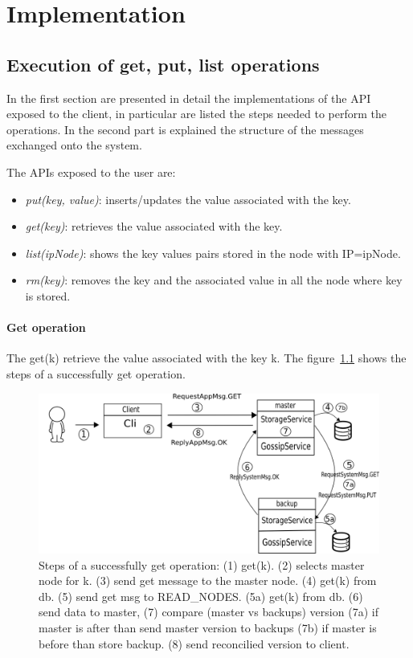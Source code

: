\chapter{Implementation}
\section{Execution of get, put, list operations}
In the first section are presented in detail the implementations of the API exposed to the client, in particular are listed the steps needed to perform the operations.  In the second part  is explained the structure of the messages exchanged onto the system.

The APIs exposed to the user are:
\begin{itemize}
	\item \emph{put(key, value)}: inserts/updates the value associated with the key.
	\item \emph{get(key)}: retrieves the value associated with the key.
	\item \emph{list(ipNode)}: shows the key values pairs stored in the node with IP=ipNode.
	\item \emph{rm(key)}: removes the key and the associated value in all the node where key is stored.
\end{itemize}

\subsubsection*{Get operation}
The get(k) retrieve the value associated with the key k.
The figure~\ref{fig:get} shows the steps of a successfully get operation.

\begin{figure}[H]
\centering
\includegraphics[scale=0.5]{figures/get.png}
\caption{Steps of a successfully get operation: (1) get(k). (2) selects master node for k. (3) send get message to the master node. (4) get(k) from db. (5) send get msg to READ\_NODES. (5a) get(k) from db. (6) send data to master, (7) compare (master vs backups) version (7a) if master is after than send master version to backups (7b) if master is before than store backup. (8) send reconcilied version to client. }
\label{fig:get}
\end{figure}

